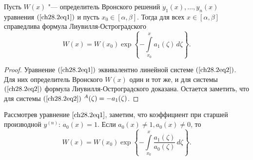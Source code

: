 \begin{thm}
Пусть $W(x)$ "--- определитель Вронского решений $y_1(x), \ldots, y_n(x)$ уравнения $(\ref{ch28.2eq1})$ и пусть $x_0 \in [\alpha, \beta]$. Тогда для всех $x \in [\alpha, \beta]$ справедлива формула Лиувилля-Остроградского
$$
W(x) = W(x_0) \exp \left\lbrace - \int\limits_{x_0}^{x} a_1(\zeta) \,d\zeta \right\rbrace.
$$
\end{thm}

\begin{proof}
Уравнение $(\ref{ch28.2eq1})$ эквивалентно линейной системе $(\ref{ch28.2eq2})$. Для них определитель Вронского $W(x)$ один и тот же, и для системы $(\ref{ch28.2eq2})$ формула Лиувилля-Остроградского доказана. Остается заметить, что для системы $(\ref{ch28.2eq2})$ $\sp A(\zeta) = - a_1(\zeta)$.
\end{proof}

\begin{notion}
Рассмотрев уравнение $\eqref{ch28.2eq1}$, заметим, что коэффициент при старшей производной $y^{(n)}$:  $a_0(x) = 1$. Если $a_0(x) \not= 1, a_0(x) \not= 0$, то 
$$
W(x) = W(x_0) \exp \left\lbrace - \int\limits_{x_0}^{x} \frac{a_1(\zeta)}{a_0(\zeta)} \,d\zeta \right\rbrace.
$$
\end{notion}